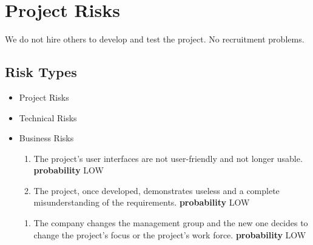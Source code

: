 \section{Project Risks}
We do not hire others to develop and test the project.
No recruitment problems.
%
\subsection{Risk Types}
\begin{itemize}
	\item Project Risks
	\item Technical Risks
	\item Business Risks
	\begin{itemize}
		
		
		
		
		\begin{enumerate}
			\item The project's user interfaces are not user-friendly and not longer usable.\newline
			\textbf{probability} LOW
			\item The project, once developed, demonstrates useless and a complete misunderstanding of the requirements.\newline
			\textbf{probability} LOW
		\end{enumerate}
		
		
		\begin{enumerate}
			\item The company changes the management group and the new one decides to change the project's focus or the project's work force.\newline
			\textbf{probability} LOW
		\end{enumerate}
		

\end{itemize}
\end{itemize}
